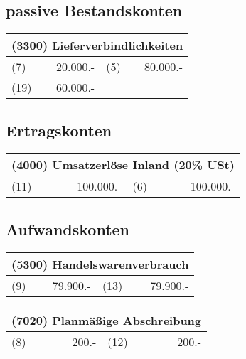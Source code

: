 \documentclass[parskip=half,12pt,a4paper]{scrartcl}
\begin{document}
\subsection{passive Bestandskonten}

\begin{center}
	\begin{tabular}{lr|lr}
		\multicolumn{4}{c}{(3300) Lieferverbindlichkeiten}\\
		\toprule
		(7) & 20.000.- & (5) & 80.000.-\\
		(19) & 60.000.- & &\\
		\bottomrule
	\end{tabular}
\end{center}

\subsection{Ertragskonten}

\begin{center}
	\begin{tabular}{lr|lr}
		\multicolumn{4}{c}{(4000) Umsatzerlöse Inland (20\% USt)}\\
		\midrule
		(11) & 100.000.- & (6) & 100.000.-\\
		\bottomrule
	\end{tabular}
\end{center}

\subsection{Aufwandskonten}

\begin{center}
	\begin{tabular}{lr|lr}
		\multicolumn{4}{c}{(5300) Handelswarenverbrauch}\\
		\toprule
		(9) & 79.900.- & (13) & 79.900.-\\
		\bottomrule
	\end{tabular}
\end{center}

\begin{center}
	\begin{tabular}{lr|lr}
		\multicolumn{4}{c}{(7020) Planmäßige Abschreibung}\\
		\toprule
		(8) & 200.- & (12) & 200.-\\
		\bottomrule
	\end{tabular}
\end{center}
\end{document}
